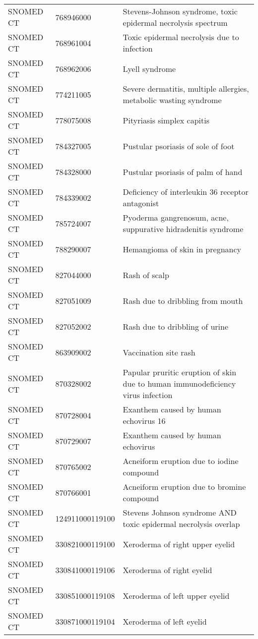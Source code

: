 \begin{longtable}{p{}p{}p{}}
  SNOMED CT & 768946000 & Stevens-Johnson syndrome, toxic epidermal necrolysis spectrum \\ 
  SNOMED CT & 768961004 & Toxic epidermal necrolysis due to infection \\ 
  SNOMED CT & 768962006 & Lyell syndrome \\ 
  SNOMED CT & 774211005 & Severe dermatitis, multiple allergies, metabolic wasting syndrome \\ 
  SNOMED CT & 778075008 & Pityriasis simplex capitis \\ 
  SNOMED CT & 784327005 & Pustular psoriasis of sole of foot \\ 
  SNOMED CT & 784328000 & Pustular psoriasis of palm of hand \\ 
  SNOMED CT & 784339002 & Deficiency of interleukin 36 receptor antagonist \\ 
  SNOMED CT & 785724007 & Pyoderma gangrenosum, acne, suppurative hidradenitis syndrome \\ 
  SNOMED CT & 788290007 & Hemangioma of skin in pregnancy \\ 
  SNOMED CT & 827044000 & Rash of scalp \\ 
  SNOMED CT & 827051009 & Rash due to dribbling from mouth \\ 
  SNOMED CT & 827052002 & Rash due to dribbling of urine \\ 
  SNOMED CT & 863909002 & Vaccination site rash \\ 
  SNOMED CT & 870328002 & Papular pruritic eruption of skin due to human immunodeficiency virus infection \\ 
  SNOMED CT & 870728004 & Exanthem caused by human echovirus 16 \\ 
  SNOMED CT & 870729007 & Exanthem caused by human echovirus \\ 
  SNOMED CT & 870765002 & Acneiform eruption due to iodine compound \\ 
  SNOMED CT & 870766001 & Acneiform eruption due to bromine compound \\ 
  SNOMED CT & 124911000119100 & Stevens Johnson syndrome AND toxic epidermal necrolysis overlap \\ 
  SNOMED CT & 330821000119100 & Xeroderma of right upper eyelid \\ 
  SNOMED CT & 330841000119106 & Xeroderma of right eyelid \\ 
  SNOMED CT & 330851000119108 & Xeroderma of left upper eyelid \\ 
  SNOMED CT & 330871000119104 & Xeroderma of left eyelid \\ 

\end{longtable}
